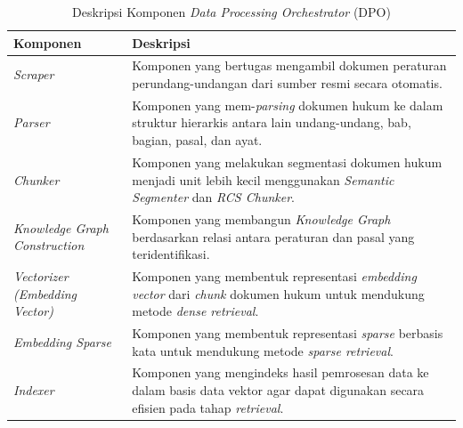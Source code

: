 \begin{table}[H]
\centering
\caption{Deskripsi Komponen \emph{Data Processing Orchestrator} (DPO)}
\label{tab:dpo-components}
\small
\begin{tabularx}{\textwidth}{|p{}|X|}
\hline \textbf{Komponen} & \textbf{Deskripsi} \\\hline
\emph{Scraper} & Komponen yang bertugas mengambil dokumen peraturan perundang-undangan dari sumber resmi secara otomatis. \\\hline
\emph{Parser} & Komponen yang mem-\emph{parsing} dokumen hukum ke dalam struktur hierarkis antara lain undang-undang, bab, bagian, pasal, dan ayat. \\\hline
\emph{Chunker} & Komponen yang melakukan segmentasi dokumen hukum menjadi unit lebih kecil menggunakan \emph{Semantic Segmenter} dan \emph{RCS Chunker}. \\\hline
\emph{Knowledge Graph Construction} & Komponen yang membangun \emph{Knowledge Graph} berdasarkan relasi antara peraturan dan pasal yang teridentifikasi. \\\hline
\emph{Vectorizer (Embedding Vector)} & Komponen yang membentuk representasi \emph{embedding vector} dari \emph{chunk} dokumen hukum untuk mendukung metode \emph{dense retrieval}. \\\hline
\emph{Embedding Sparse} & Komponen yang membentuk representasi \emph{sparse} berbasis kata untuk mendukung metode \emph{sparse retrieval}. \\\hline
\emph{Indexer} & Komponen yang mengindeks hasil pemrosesan data ke dalam basis data vektor agar dapat digunakan secara efisien pada tahap \emph{retrieval}. \\\hline
\end{tabularx}
\end{table}

